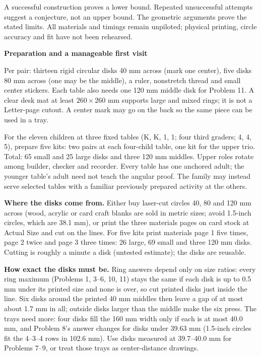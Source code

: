 \documentclass[11pt]{article}
\newcommand{\heading}[1]{\par\textbf{#1}\par}
\begin{document}
A successful construction proves a lower bound. Repeated unsuccessful attempts suggest a conjecture, not an upper bound. The geometric arguments prove the stated limits. All materials and timings remain unpiloted; physical printing, circle accuracy and fit have not been rehearsed.
\newpage
\heading{Preparation and a manageable first visit}
Per pair: thirteen rigid circular disks 40 mm across (mark one center), five disks 80 mm across (one may be the middle), a ruler, nonstretch thread and small center stickers. Each table also needs one 120 mm middle disk for Problem 11. A clear desk mat at least $260\times 260$ mm supports large and mixed rings; it is not a Letter-page cutout. A center mark may go on the back so the same piece can be used in a tray.

For the eleven children at three fixed tables (K, K, 1, 1; four third graders; 4, 4, 5), prepare five kits: two pairs at each four-child table, one kit for the upper trio. Total: 65 small and 25 large disks and three 120 mm middles. Upper roles rotate among builder, checker and recorder. Every table has one anchored adult; the younger table's adult need not teach the angular proof. The family may instead serve selected tables with a familiar previously prepared activity at the others.

\textbf{Where the disks come from.} Either buy laser-cut circles 40, 80 and 120 mm across (wood, acrylic or card craft blanks are sold in metric sizes; avoid 1.5-inch circles, which are 38.1 mm), or print the three materials pages on card stock at Actual Size and cut on the lines. For five kits print materials page 1 five times, page 2 twice and page 3 three times: 26 large, 69 small and three 120 mm disks. Cutting is roughly a minute a disk (untested estimate); the disks are reusable.

\textbf{How exact the disks must be.} Ring answers depend only on size ratios: every ring maximum (Problems 1, 3--6, 10, 11) stays the same if each disk is up to 0.5 mm under its printed size and none is over, so cut printed disks just inside the line. Six disks around the printed 40 mm middles then leave a gap of at most about 1.7 mm in all; outside disks larger than the middle make the six press. The trays need more: four disks fill the 160 mm width only if each is at most 40.0 mm, and Problem 8's answer changes for disks under 39.63 mm (1.5-inch circles fit the 4--3--4 rows in 102.6 mm). Use disks measured at 39.7--40.0 mm for Problems 7--9, or treat those trays as center-distance drawings.
\end{document}
